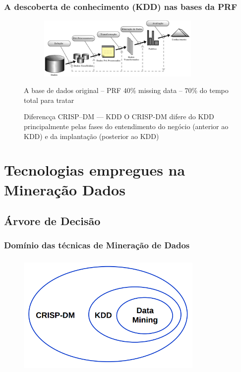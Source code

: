 \documentclass[11pt]{beamer}
\begin{document}
\begin{frame}\frametitle{ A descoberta de conhecimento (KDD) nas bases da PRF}
	\begin{figure}[!ht]
		\includegraphics[width=100mm, height=30mm]{Figuras/BigData/Fayyad.png}
		\pause
		\begin{block}{ A base de dados original -- PRF}			
			40\% missing data -- 70\% do tempo total para tratar
		\end{block}
		\pause
		\begin{alertblock}{ Diferencça CRISP--DM --- KDD}			
			O CRISP-DM difere do KDD principalmente pelas fases do entendimento do  negócio (anterior ao KDD) e da implantação (posterior ao KDD)
		\end{alertblock}
	\end{figure}
\end{frame}



\section{ Tecnologias empregues na Mineração Dados}
\subsection*{ Árvore de Decisão}

\begin{frame}\frametitle{ Domínio das técnicas de Mineração de Dados}
	\transdissolve[duration=2, direction=25]
	\begin{figure}[!ht]
		\includegraphics[width=90mm, height=60mm]{Figuras/BigData/RelacaoCrispKddDm.png}
	\end{figure}
\end{frame}
\end{document}
